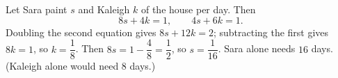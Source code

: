 Let Sara paint $s$ and Kaleigh $k$ of the house per day. Then
\[
8s+4k=1,\qquad 4s+6k=1 .
\]
Doubling the second equation gives $8s+12k=2$; subtracting the first gives $8k=1$, so $k=\dfrac{1}{8}$. Then $8s=1-\dfrac{4}{8}=\dfrac{1}{2}$, so $s=\dfrac{1}{16}$. Sara alone needs $\boxed{16}$ days. (Kaleigh alone would need $8$ days.)
